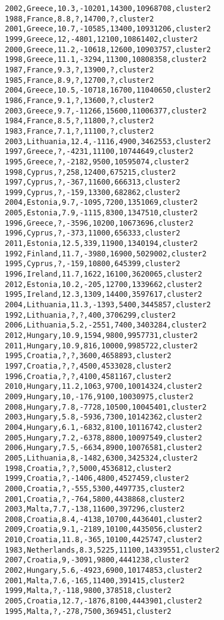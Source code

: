 \begin{lstlisting}[basicstyle=\footnotesize\ttfamily,numbers=none]
2002,Greece,10.3,-10201,14300,10968708,cluster2
1988,France,8.8,?,14700,?,cluster2
2001,Greece,10.7,-10585,13400,10931206,cluster2
1999,Greece,12,-4801,12100,10861402,cluster2
2000,Greece,11.2,-10618,12600,10903757,cluster2
1998,Greece,11.1,-3294,11300,10808358,cluster2
1987,France,9.3,?,13900,?,cluster2
1985,France,8.9,?,12700,?,cluster2
2004,Greece,10.5,-10718,16700,11040650,cluster2
1986,France,9.1,?,13600,?,cluster2
2003,Greece,9.7,-11266,15600,11006377,cluster2
1984,France,8.5,?,11800,?,cluster2
1983,France,7.1,?,11100,?,cluster2
2003,Lithuania,12.4,-1116,4900,3462553,cluster2
1997,Greece,?,-4231,11100,10744649,cluster2
1995,Greece,?,-2182,9500,10595074,cluster2
1998,Cyprus,?,258,12400,675215,cluster2
1997,Cyprus,?,-367,11600,666313,cluster2
1999,Cyprus,?,-159,13300,682862,cluster2
2004,Estonia,9.7,-1095,7200,1351069,cluster2
2005,Estonia,7.9,-1115,8300,1347510,cluster2
1996,Greece,?,-3596,10200,10673696,cluster2
1996,Cyprus,?,-373,11000,656333,cluster2
2011,Estonia,12.5,339,11900,1340194,cluster2
1992,Finland,11.7,-3980,16900,5029002,cluster2
1995,Cyprus,?,-159,10800,645399,cluster2
1996,Ireland,11.7,1622,16100,3620065,cluster2
2012,Estonia,10.2,-205,12700,1339662,cluster2
1995,Ireland,12.3,1309,14400,3597617,cluster2
2004,Lithuania,11.3,-1393,5400,3445857,cluster2
1992,Lithuania,?,?,400,3706299,cluster2
2006,Lithuania,5.2,-2551,7400,3403284,cluster2
2012,Hungary,10.9,1594,9800,9957731,cluster2
2011,Hungary,10.9,816,10000,9985722,cluster2
1995,Croatia,?,?,3600,4658893,cluster2
1997,Croatia,?,?,4500,4533028,cluster2
1996,Croatia,?,?,4100,4581167,cluster2
2010,Hungary,11.2,1063,9700,10014324,cluster2
2009,Hungary,10,-176,9100,10030975,cluster2
2008,Hungary,7.8,-7728,10500,10045401,cluster2
2003,Hungary,5.8,-5936,7300,10142362,cluster2
2004,Hungary,6.1,-6832,8100,10116742,cluster2
2005,Hungary,7.2,-6378,8800,10097549,cluster2
2006,Hungary,7.5,-6634,8900,10076581,cluster2
2005,Lithuania,8,-1482,6300,3425324,cluster2
1998,Croatia,?,?,5000,4536812,cluster2
1999,Croatia,?,-1406,4800,4527459,cluster2
2000,Croatia,?,-555,5300,4497735,cluster2
2001,Croatia,?,-764,5800,4438868,cluster2
2003,Malta,7.7,-138,11600,397296,cluster2
2008,Croatia,8.4,-4138,10700,4436401,cluster2
2009,Croatia,9.1,-2189,10100,4435056,cluster2
2010,Croatia,11.8,-365,10100,4425747,cluster2
1983,Netherlands,8.3,5225,11100,14339551,cluster2
2007,Croatia,9,-3091,9800,4441238,cluster2
2002,Hungary,5.6,-4923,6900,10174853,cluster2
2001,Malta,7.6,-165,11400,391415,cluster2
1999,Malta,?,-118,9800,378518,cluster2
2005,Croatia,12.7,-1876,8100,4443901,cluster2
1995,Malta,?,-278,7500,369451,cluster2

\end{lstlisting}

